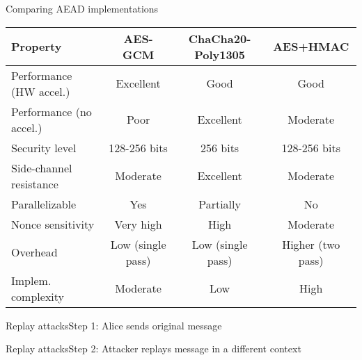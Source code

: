 \documentclass[aspectratio=169, lualatex, handout]{beamer}
\begin{document}
\begin{frame}{Comparing AEAD implementations}
	\begin{center}
		\begin{tabular}{|l|c|c|c|}
			\hline
			\textbf{Property}       & \textbf{AES-GCM}  & \textbf{ChaCha20-Poly1305} & \textbf{AES+HMAC} \\
			\hline
			Performance (HW accel.) & Excellent         & Good                       & Good              \\
			\hline
			Performance (no accel.) & Poor              & Excellent                  & Moderate          \\
			\hline
			Security level          & 128-256 bits      & 256 bits                   & 128-256 bits      \\
			\hline
			Side-channel resistance & Moderate          & Excellent                  & Moderate          \\
			\hline
			Parallelizable          & Yes               & Partially                  & No                \\
			\hline
			Nonce sensitivity       & Very high         & High                       & Moderate          \\
			\hline
			Overhead                & Low (single pass) & Low (single pass)          & Higher (two pass) \\
			\hline
			Implem. complexity      & Moderate          & Low                        & High              \\
			\hline
		\end{tabular}
	\end{center}
\end{frame}

\begin{frame}{Replay attacks}{Step 1: Alice sends original message}
\end{frame}

\begin{frame}{Replay attacks}{Step 2: Attacker replays message in a different context}
\end{frame}
\end{document}
